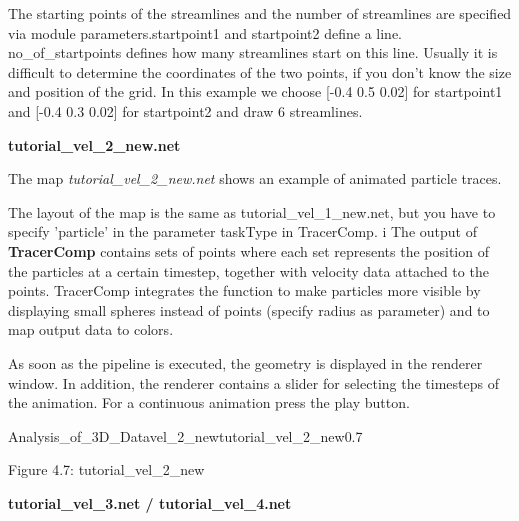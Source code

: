 The starting points of the streamlines and the number of streamlines are specified via
module parameters.startpoint1 and startpoint2 define a line. no\_of\_startpoints 
defines how many streamlines start on this line. Usually it is difficult to
determine the coordinates of the two points, if you don't know the size and position of 
the grid. In this example we choose [-0.4 0.5 0.02] for startpoint1 and [-0.4 0.3 0.02] 
for startpoint2 and draw 6 streamlines. 


\vspace{1cm}
\begin{Large}{\bf tutorial\_vel\_2\_new.net}\end{Large}
\vspace{0.5cm}



The map {\it tutorial\_vel\_2\_new.net} shows an example of animated particle traces. 

The layout of the map is the same as tutorial\_vel\_1\_new.net, but you have to specify
'particle' in the parameter taskType in TracerComp. i
The output of {\bf TracerComp} contains sets of points where each set represents the 
position of the particles at a certain timestep, together with velocity data attached 
to the points. TracerComp integrates the function to make particles more visible by displaying small 
spheres instead of points (specify radius as parameter) and to map output data 
to colors. 


As soon as the pipeline is executed, the geometry is displayed in the renderer 
window. In addition, the renderer contains a slider for selecting the timesteps of 
the animation. For a continuous animation press the play button.

\begin{covimg}{Analysis_of_3D_Data}{vel_2_new}{tutorial\_vel\_2\_new}{0.7}\end{covimg}
\begin{htmlonly}
Figure 4.7: tutorial_vel_2_new
\vspace{0.5cm}
\end{htmlonly}


\vspace{1cm}
\begin{Large}{\bf tutorial\_vel\_3.net / tutorial\_vel\_4.net}\end{Large}
\vspace{0.5cm}


